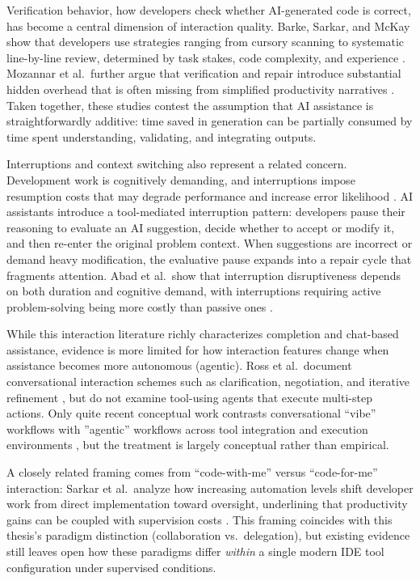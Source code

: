 Verification behavior, how developers check whether AI-generated code is correct, has become a central dimension of interaction quality. Barke, Sarkar, and McKay show that developers use strategies ranging from cursory scanning to systematic line-by-line review, determined by task stakes, code complexity, and experience \parencite{barke2023trust}. Mozannar et al.\ further argue that verification and repair introduce substantial hidden overhead that is often missing from simplified productivity narratives \parencite{mozannar2024reading}. Taken together, these studies contest the assumption that AI assistance is straightforwardly additive: time saved in generation can be partially consumed by time spent understanding, validating, and integrating outputs.

Interruptions and context switching also represent a related concern. Development work is cognitively demanding, and interruptions impose resumption costs that may degrade performance and increase error likelihood \parencite{parnin2011resumption}. AI assistants introduce a tool-mediated interruption pattern: developers pause their reasoning to evaluate an AI suggestion, decide whether to accept or modify it, and then re-enter the original problem context. When suggestions are incorrect or demand heavy modification, the evaluative pause expands into a repair cycle that fragments attention. Abad et al.\ show that interruption disruptiveness depends on both duration and cognitive demand, with interruptions requiring active problem-solving being more costly than passive ones \parencite{abad2018taskInterruption}.

While this interaction literature richly characterizes completion and chat-based assistance, evidence is more limited for how interaction features change when assistance becomes more autonomous (agentic). Ross et al.\ document conversational interaction schemes such as clarification, negotiation, and iterative refinement \parencite{ross2023programmer}, but do not examine tool-using agents that execute multi-step actions. Only quite recent conceptual work contrasts conversational ``vibe'' workflows with ''agentic''  workflows across tool integration and execution environments \parencite{sapkota2025vibecoding}, but the treatment is largely conceptual rather than empirical.

A closely related framing comes from ``code-with-me'' versus ``code-for-me'' interaction: Sarkar et al.\ analyze how increasing automation levels shift developer work from direct implementation toward oversight, underlining that productivity gains can be coupled with supervision costs \parencite{sarkar2025codewithme}. This framing coincides with this thesis’s paradigm distinction (collaboration vs.\ delegation), but existing evidence still leaves open how these paradigms differ \emph{within} a single modern IDE tool configuration under supervised conditions.

